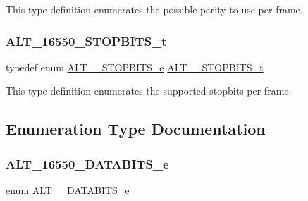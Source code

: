 This type definition enumerates the possible parity to use per frame. \mbox{\label{group__UART__LINE_gaf2b594c54a5c750b62111afe25088c81}} 
\subsubsection{\texorpdfstring{ALT\_16550\_STOPBITS\_t}{ALT\_16550\_STOPBITS\_t}}
{\footnotesize\ttfamily typedef enum \mbox{\hyperlink{group__UART__LINE_ga737333dc2e06f30e344ca799a37c91b8}{A\+L\+T\+\_\+\_\+\+S\+T\+O\+P\+B\+I\+T\+S\+\_\+e}}
 \mbox{\hyperlink{group__UART__LINE_gaf2b594c54a5c750b62111afe25088c81}{A\+L\+T\+\_\+\_\+\+S\+T\+O\+P\+B\+I\+T\+S\+\_\+t}}}

This type definition enumerates the supported stopbits per frame. 

\subsection{Enumeration Type Documentation}
\mbox{\label{group__UART__LINE_ga8e9059237616c661191ac9fd517a812e}} 
\subsubsection{\texorpdfstring{ALT\_16550\_DATABITS\_e}{ALT\_16550\_DATABITS\_e}}
{\footnotesize\ttfamily enum \mbox{\hyperlink{group__UART__LINE_ga8e9059237616c661191ac9fd517a812e}{A\+L\+T\+\_\+\_\+\+D\+A\+T\+A\+B\+I\+T\+S\+\_\+e}}}

